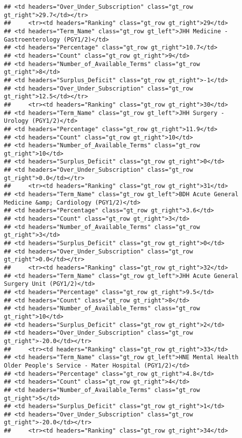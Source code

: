 \documentclass[
]{article}
\begin{document}
\begin{verbatim}
## <td headers="Over_Under_Subscription" class="gt_row gt_right">29.7</td></tr>
##     <tr><td headers="Ranking" class="gt_row gt_right">29</td>
## <td headers="Term_Name" class="gt_row gt_left">JHH Medicine - Gastroenterology (PGY1/2)</td>
## <td headers="Percentage" class="gt_row gt_right">10.7</td>
## <td headers="Count" class="gt_row gt_right">9</td>
## <td headers="Number_of_Available_Terms" class="gt_row gt_right">8</td>
## <td headers="Surplus_Deficit" class="gt_row gt_right">-1</td>
## <td headers="Over_Under_Subscription" class="gt_row gt_right">12.5</td></tr>
##     <tr><td headers="Ranking" class="gt_row gt_right">30</td>
## <td headers="Term_Name" class="gt_row gt_left">JHH Surgery - Urology (PGY1/2)</td>
## <td headers="Percentage" class="gt_row gt_right">11.9</td>
## <td headers="Count" class="gt_row gt_right">10</td>
## <td headers="Number_of_Available_Terms" class="gt_row gt_right">10</td>
## <td headers="Surplus_Deficit" class="gt_row gt_right">0</td>
## <td headers="Over_Under_Subscription" class="gt_row gt_right">0.0</td></tr>
##     <tr><td headers="Ranking" class="gt_row gt_right">31</td>
## <td headers="Term_Name" class="gt_row gt_left">BDH Acute General Medicine &amp; Cardiology (PGY1/2)</td>
## <td headers="Percentage" class="gt_row gt_right">3.6</td>
## <td headers="Count" class="gt_row gt_right">3</td>
## <td headers="Number_of_Available_Terms" class="gt_row gt_right">3</td>
## <td headers="Surplus_Deficit" class="gt_row gt_right">0</td>
## <td headers="Over_Under_Subscription" class="gt_row gt_right">0.0</td></tr>
##     <tr><td headers="Ranking" class="gt_row gt_right">32</td>
## <td headers="Term_Name" class="gt_row gt_left">JHH Acute General Surgery Unit (PGY1/2)</td>
## <td headers="Percentage" class="gt_row gt_right">9.5</td>
## <td headers="Count" class="gt_row gt_right">8</td>
## <td headers="Number_of_Available_Terms" class="gt_row gt_right">10</td>
## <td headers="Surplus_Deficit" class="gt_row gt_right">2</td>
## <td headers="Over_Under_Subscription" class="gt_row gt_right">-20.0</td></tr>
##     <tr><td headers="Ranking" class="gt_row gt_right">33</td>
## <td headers="Term_Name" class="gt_row gt_left">HNE Mental Health Older People's Service - Mater Hospital (PGY1/2)</td>
## <td headers="Percentage" class="gt_row gt_right">4.8</td>
## <td headers="Count" class="gt_row gt_right">4</td>
## <td headers="Number_of_Available_Terms" class="gt_row gt_right">5</td>
## <td headers="Surplus_Deficit" class="gt_row gt_right">1</td>
## <td headers="Over_Under_Subscription" class="gt_row gt_right">-20.0</td></tr>
##     <tr><td headers="Ranking" class="gt_row gt_right">34</td>

\end{verbatim}
\end{document}
